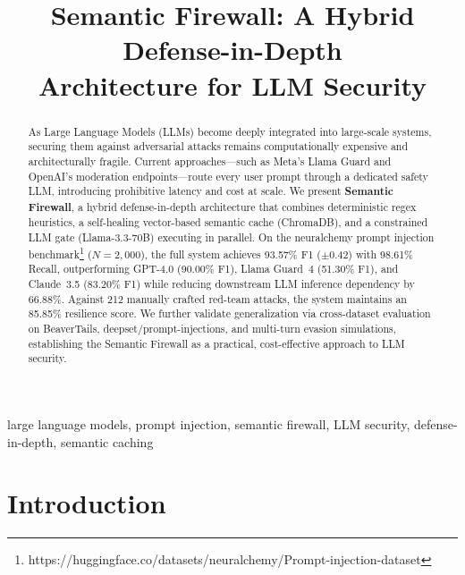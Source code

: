 \documentclass[conference]{IEEEtran}
\begin{document}
\title{Semantic Firewall: A Hybrid Defense-in-Depth\\Architecture for LLM Security}

\author{}

\maketitle

\begin{abstract}
As Large Language Models (LLMs) become deeply integrated into
large-scale systems, securing them against adversarial attacks
remains computationally expensive and architecturally fragile. Current
approaches---such as Meta's Llama Guard and OpenAI's moderation
endpoints---route every user prompt through a dedicated safety LLM,
introducing prohibitive latency and cost at scale. We present
\textbf{Semantic Firewall}, a hybrid defense-in-depth architecture that
combines deterministic regex heuristics, a self-healing vector-based
semantic cache (ChromaDB), and a constrained LLM gate (Llama-3.3-70B)
executing in parallel. On the neuralchemy prompt injection benchmark\footnote{https://huggingface.co/datasets/neuralchemy/Prompt-injection-dataset}
($N{=}2{,}000$), the full system achieves 93.57\% F1 ($\pm$0.42) with
98.61\% Recall, outperforming GPT-4.0 (90.00\% F1), Llama Guard~4
(51.30\% F1), and Claude~3.5 (83.20\% F1) while reducing
downstream LLM inference dependency by 66.88\%. Against 212 manually
crafted red-team attacks, the system maintains an 85.85\% resilience
score. We further validate generalization via cross-dataset evaluation
on BeaverTails, deepset/prompt-injections, and
multi-turn evasion simulations, establishing the Semantic Firewall as a
practical, cost-effective approach to LLM security.
\end{abstract}

\begin{IEEEkeywords}
large language models, prompt injection, semantic firewall, LLM
security, defense-in-depth, semantic caching
\end{IEEEkeywords}

\section{Introduction}
\end{document}
